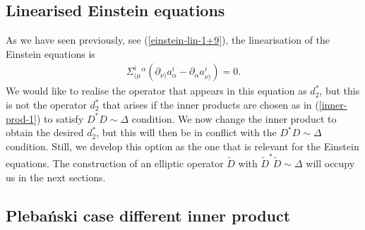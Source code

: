 \documentclass[10pt]{report}
\newcommand{\pleb}[0]{Pleba\'nski}
\theoremstyle{definition}
\begin{document}
\subsection{Linearised Einstein equations}

As we have seen previously, see (\ref{einstein-lin-1+9}), the linearisation of the Einstein equations is 
\begin{align}\label{correct-d2-star}
\Sigma^i_{(\mu}{}^\alpha (\partial_{\nu)} a_\alpha^i - \partial_\alpha a_{\nu)}^i) =0.
\end{align}
We would like to realise the operator that appears in this equation as $d_2^*$, but this is not the operator $d_2^*$ that arises if the inner products are chosen as in (\ref{inner-prod-1}) to satisfy $D^*D\sim \Delta$ condition. We now change the inner product to obtain the desired $d_2^*$, but this will then be in conflict with the $D^*D\sim \Delta$ condition. Still, we develop this option as the one that is relevant for the Einstein equations. The construction of an elliptic operator $\tilde{D}$ with $\tilde{D}^*\tilde{D}\sim \Delta$ will occupy us in the next sections. 

\subsection{\pleb{} case different inner product}
\end{document}
